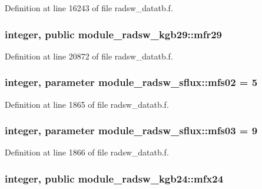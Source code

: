 Definition at line 16243 of file radsw\+\_\+datatb.\+f.

\subsubsection[{\texorpdfstring{mfr29}{mfr29}}]{\setlength{\rightskip}{0pt plus 5cm}integer, public module\+\_\+radsw\+\_\+kgb29\+::mfr29}\hypertarget{group__module__radsw__main_ga866ce18e53b84d75d51dd8c6a999ee7b}{}\label{group__module__radsw__main_ga866ce18e53b84d75d51dd8c6a999ee7b}


Definition at line 20872 of file radsw\+\_\+datatb.\+f.

\subsubsection[{\texorpdfstring{mfs02}{mfs02}}]{\setlength{\rightskip}{0pt plus 5cm}integer, parameter module\+\_\+radsw\+\_\+sflux\+::mfs02 = 5}\hypertarget{group__module__radsw__main_gacca3bbc0dd125a3e8c3734c58c48e79b}{}\label{group__module__radsw__main_gacca3bbc0dd125a3e8c3734c58c48e79b}


Definition at line 1865 of file radsw\+\_\+datatb.\+f.

\subsubsection[{\texorpdfstring{mfs03}{mfs03}}]{\setlength{\rightskip}{0pt plus 5cm}integer, parameter module\+\_\+radsw\+\_\+sflux\+::mfs03 = 9}\hypertarget{group__module__radsw__main_ga5bd55a5106ce82bd47250d38d9b8f22a}{}\label{group__module__radsw__main_ga5bd55a5106ce82bd47250d38d9b8f22a}


Definition at line 1866 of file radsw\+\_\+datatb.\+f.

\subsubsection[{\texorpdfstring{mfx24}{mfx24}}]{\setlength{\rightskip}{0pt plus 5cm}integer, public module\+\_\+radsw\+\_\+kgb24\+::mfx24}\hypertarget{group__module__radsw__main_ga6fcafb0e1605ad49a252ed1e22b00a5b}{}\label{group__module__radsw__main_ga6fcafb0e1605ad49a252ed1e22b00a5b}


